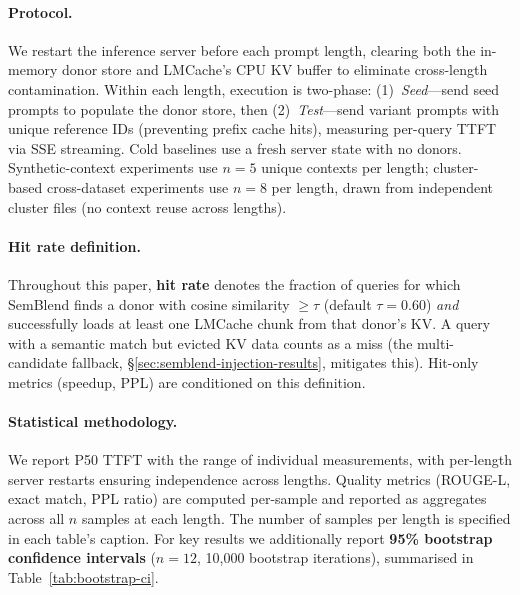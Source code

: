 \documentclass[10pt,twocolumn]{article}
\begin{document}
\paragraph{Protocol.} We restart the inference server before each
prompt length, clearing both the in-memory donor store and LMCache's
CPU KV buffer to eliminate cross-length contamination.
Within each length, execution is two-phase:
(1)~\emph{Seed}---send seed prompts to populate the donor store, then
(2)~\emph{Test}---send variant prompts with unique reference IDs
(preventing prefix cache hits), measuring per-query TTFT via SSE
streaming. Cold baselines use a fresh server state with no donors.
Synthetic-context experiments use $n{=}5$ unique contexts per length;
cluster-based cross-dataset experiments use $n{=}8$ per length,
drawn from independent cluster files (no context reuse across lengths).

\paragraph{Hit rate definition.}
Throughout this paper, \textbf{hit rate} denotes the fraction of
queries for which SemBlend finds a donor with cosine similarity
${\geq}\tau$ (default $\tau{=}0.60$) \emph{and} successfully loads
at least one LMCache chunk from that donor's KV. A query with a
semantic match but evicted KV data counts as a miss (the
multi-candidate fallback, \S\ref{sec:semblend-injection-results},
mitigates this). Hit-only metrics (speedup, PPL) are conditioned
on this definition.

\paragraph{Statistical methodology.} We report P50 TTFT with the
range of individual measurements, with per-length server restarts
ensuring independence across lengths. Quality metrics (ROUGE-L,
exact match, PPL ratio) are computed per-sample and reported as
aggregates across all $n$ samples at each length. The number of
samples per length is specified in each table's caption.
For key results we additionally report \textbf{95\% bootstrap
confidence intervals} ($n{=}12$, 10{,}000 bootstrap iterations),
summarised in Table~\ref{tab:bootstrap-ci}.
\end{document}
